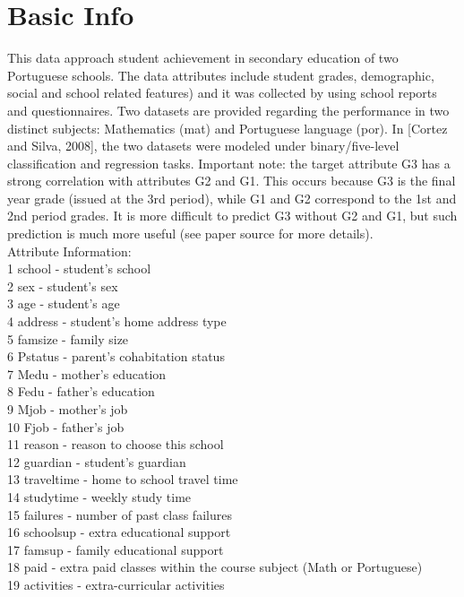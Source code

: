 \documentclass{article}
\begin{document}
\section{Basic Info}
This data approach student achievement in secondary education of two Portuguese schools. The data attributes include student grades, demographic, social and school related features) and it was collected by using school reports and questionnaires. Two datasets are provided regarding the performance in two distinct subjects: Mathematics (mat) and Portuguese language (por). In [Cortez and Silva, 2008], the two datasets were modeled under binary/five-level classification and regression tasks. Important note: the target attribute G3 has a strong correlation with attributes G2 and G1. This occurs because G3 is the final year grade (issued at the 3rd period), while G1 and G2 correspond to the 1st and 2nd period grades. It is more difficult to predict G3 without G2 and G1, but such prediction is much more useful (see paper source for more details). \\
Attribute Information: \\
1 school - student's school  \\
2 sex - student's sex  \\
3 age - student's age  \\
4 address - student's home address type  \\
5 famsize - family size  \\
6 Pstatus - parent's cohabitation status  \\
7 Medu - mother's education  \\
8 Fedu - father's education  \\
9 Mjob - mother's job  \\
10 Fjob - father's job  \\
11 reason - reason to choose this school  \\
12 guardian - student's guardian  \\
13 traveltime - home to school travel time  \\
14 studytime - weekly study time \\
15 failures - number of past class failures  \\
16 schoolsup - extra educational support  \\
17 famsup - family educational support  \\
18 paid - extra paid classes within the course subject (Math or Portuguese) \\
19 activities - extra-curricular activities  \\
\end{document}
